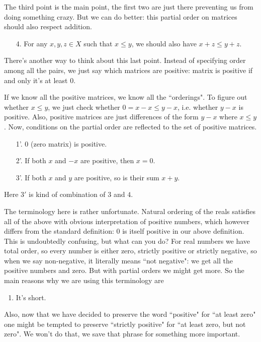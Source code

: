 The third point is the main point, the first two are just there preventing us from doing something crazy. But we can do better: this partial order on matrices should also respect addition.
\begin{enumerate}
\item[4.] For any $x, y, z \in X$ such that $x \leq y$, we should also have $x + z \leq y + z$.
\end{enumerate}

There's another way to think about this last point. Instead of specifying order among all the pairs, we just say which matrices are positive: matrix is positive if and only it's at least $0$.

If we know all the positive matrices, we know all the ``orderings". To figure out whether $x \leq y$, we just check whether $0 = x - x \leq y - x$, i.e. whether $y - x$ is positive. Also, positive matrices are just differences of the form $y - x$ where $x \leq y$. Now, conditions on the partial order are reflected to the set of positive matrices.
\begin{enumerate}
	\item[1'.] $0$ (zero matrix) is positive.
	\item[2'.] If both $x$ and $-x$ are positive, then $x = 0$.
	\item[3'.] If both $x$ and $y$ are positive, so is their sum $x + y$.
\end{enumerate}
Here $3'$ is kind of combination of $3$ and $4$.

The terminology here is rather unfortunate. Natural ordering of the reals satisfies all of the above with obvious interpretation of positive numbers, which however differs from the standard definition: $0$ is itself positive in our above definition. This is undoubtedly confusing, but what can you do? For real numbers we have total order, so every number is either zero, strictly positive or strictly negative, so when we say non-negative, it literally means ``not negative": we get all the positive numbers and zero. But with partial orders we might get more. So the main reasons why we are using this terminology are
\begin{enumerate}
	\item It's short.
\end{enumerate}
Also, now that we have decided to preserve the word ``positive" for ``at least zero" one might be tempted to preserve ``strictly positive" for ``at least zero, but not zero". We won't do that, we save that phrase for something more important.

